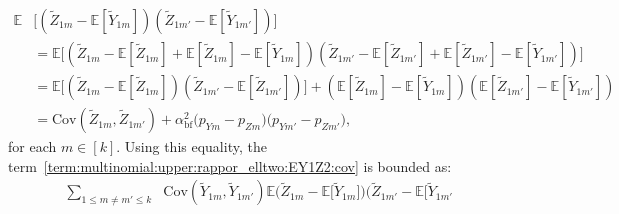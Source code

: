 \documentclass[twoside,11pt]{article}
\newcommand{\rvTwo}{Y}
\newcommand{\rvThree}{Z}
\newcommand{\private}[1]{\tilde{#1}}
\newcommand{\mE}{\mathbb{E}} %
\newcommand{\alphabetSize}{k} %
\newcommand{\vectorIndex}{m}
\newcommand{\probVecElement}[2]{p_{{#1}{#2}}}
\newcommand{\privacyParameter}{\alpha} %
\newcommand{\privacyParameterrappor}{\privacyParameter_{\mathrm{bf}}}
\begin{document}
\begin{appendix}
\begin{itemize}
	\begin{align*}
		\mE&
		\bigl[ %
		(
		\private{\rvThree}_{1 \vectorIndex}
		-
		\mE
		[
		\private{\rvTwo}_{1 \vectorIndex}
		]
		)
		(
		\private{\rvThree}_{1 \vectorIndex'}
		-
		\mE
		[
		\private{\rvTwo}_{1 \vectorIndex'}
		]
		)
		\bigr]
		\\&=
		\mE
		\bigl[ %
		(
		\private{\rvThree}_{1 \vectorIndex}
		-
		\mE
		[
		\private{\rvThree}_{1 \vectorIndex}
		]
		+
		\mE
		[
		\private{\rvThree}_{1 \vectorIndex}
		]
		-
		\mE
		[
		\private{\rvTwo}_{1 \vectorIndex}
		]
		)
		(
		\private{\rvThree}_{1 \vectorIndex'}
		-
		\mE
		[
		\private{\rvThree}_{1 \vectorIndex'}
		]
		+
		\mE
		[
		\private{\rvThree}_{1 \vectorIndex'}
		]
		-
		\mE
		[
		\private{\rvTwo}_{1 \vectorIndex'}
		]
		)
		\bigr]
		\\&=
		\mE
		\bigl[ %
		(
		\private{\rvThree}_{1 \vectorIndex}
		-
		\mE
		[
		\private{\rvThree}_{1 \vectorIndex}
		])
		(
		\private{\rvThree}_{1 \vectorIndex'}
		-
		\mE
		[
		\private{\rvThree}_{1 \vectorIndex'}
		])
		\bigr]
		+
		(
		\mE
		[
		\private{\rvThree}_{1 \vectorIndex}
		]
		-
		\mE
		[
		\private{\rvTwo}_{1 \vectorIndex}
		]
		)
		(
		\mE
		[
		\private{\rvThree}_{1 \vectorIndex'}
		]
		-
		\mE
		[
		\private{\rvTwo}_{1 \vectorIndex'}
		]
		)
		\\&=
		\mathrm{Cov}
		(
		\private{\rvThree}_{1 \vectorIndex}
		,
		\private{\rvThree}_{1 \vectorIndex'}
		)
		+
		\privacyParameterrappor^2
		\bigl(  \probVecElement{\rvTwo}{\vectorIndex} - \probVecElement{\rvThree}{\vectorIndex}\bigr)
		\bigl(  \probVecElement{\rvTwo}{\vectorIndex'} - \probVecElement{\rvThree}{\vectorIndex'}\bigr),
	\end{align*}
	for each $\vectorIndex \in [\alphabetSize]$.
	Using this equality, the term~\eqref{term:multinomial:upper:rappor_elltwo:EY1Z2:cov} is bounded as:
	\begin{align*}
		\sum_{1 \leq \vectorIndex \neq \vectorIndex' \leq \alphabetSize}
		&%
		\mathrm{Cov}(\private{Y}_{1 \vectorIndex}, \private{Y}_{1 \vectorIndex'})
		\mE
		\bigl( %
		\private{\rvThree}_{1 \vectorIndex}
		-
		\mE
		\bigl[
		\private{\rvTwo}_{1 \vectorIndex}
		\bigr]
		\bigr)%
		\bigl( %
		\private{\rvThree}_{1 \vectorIndex'}
		-
		\mE
		\bigl[
		\private{\rvTwo}_{1 \vectorIndex'}

\end{align*}
\end{itemize}
\end{appendix}
\end{document}

